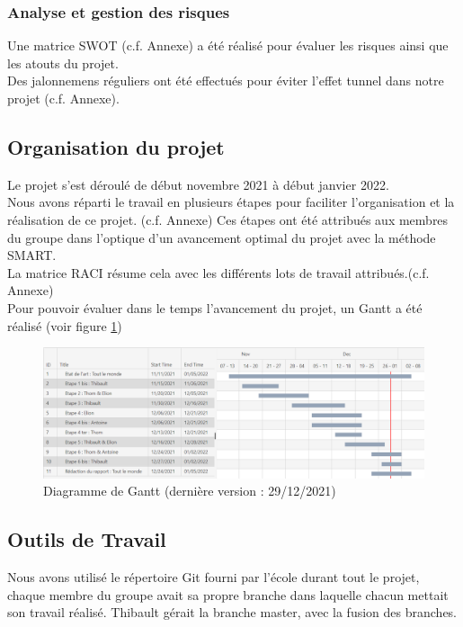 \subsubsection{Analyse et gestion des risques}

\noindent
Une matrice SWOT (c.f. Annexe) a été réalisé pour évaluer les risques ainsi que les atouts du projet.\\
Des jalonnemens réguliers ont été effectués pour éviter l'effet tunnel dans notre projet (c.f. Annexe).

\vskip 0.5cm

\subsection{Organisation du projet}

\noindent
Le projet s'est déroulé de début novembre 2021 à début janvier 2022.\\
Nous avons réparti le travail en plusieurs étapes pour faciliter l'organisation et la réalisation de ce projet. (c.f. Annexe)
Ces étapes ont été attribués aux membres du groupe dans l'optique d'un avancement optimal du projet avec la méthode SMART.\\
La matrice RACI résume cela avec les différents lots de travail attribués.(c.f. Annexe)\\
Pour pouvoir évaluer dans le temps l'avancement du projet, un Gantt a été réalisé (voir figure \ref{fig:gantt})

    \begin{figure}[!ht]
        \includegraphics[scale = 0.575] {Gantt.png}
        \caption{Diagramme de Gantt (dernière version : 29/12/2021)}
        \label{fig:gantt}
    \end{figure}

\newpage
\subsection{Outils de Travail}
\noindent
Nous avons utilisé le répertoire Git fourni par l'école durant tout le projet, chaque membre du groupe avait sa propre branche dans laquelle chacun mettait son travail réalisé. Thibault gérait la branche master, avec la fusion des branches.


